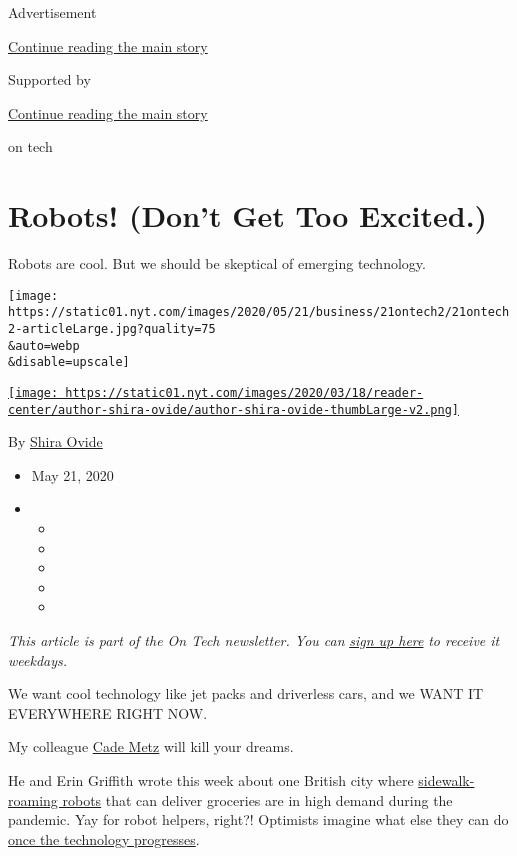 Advertisement

\protect\hyperlink{after-top}{Continue reading the main story}

Supported by

\protect\hyperlink{after-sponsor}{Continue reading the main story}

on tech

\hypertarget{robots-dont-get-too-excited}{%
\section{Robots! (Don't Get Too
Excited.)}\label{robots-dont-get-too-excited}}

Robots are cool. But we should be skeptical of emerging technology.

\texttt{[image: https://static01.nyt.com/images/2020/05/21/business/21ontech2/21ontech2-articleLarge.jpg?quality=75\\\&auto=webp\\\&disable=upscale]}

\href{https://www.nytimes.com/by/shira-ovide}{\texttt{[image: https://static01.nyt.com/images/2020/03/18/reader-center/author-shira-ovide/author-shira-ovide-thumbLarge-v2.png]}}

By \href{https://www.nytimes.com/by/shira-ovide}{Shira Ovide}

\begin{itemize}
\item
  May 21, 2020
\item
  \begin{itemize}
  \item
  \item
  \item
  \item
  \item
  \end{itemize}
\end{itemize}

\emph{This article is part of the On Tech newsletter. You can}
\href{https://www.nytimes.com/newsletters/signup/OT}{\emph{sign up
here}} \emph{to receive it weekdays.}

We want cool technology like jet packs and driverless cars, and we WANT
IT EVERYWHERE RIGHT NOW.

My colleague \href{https://www.nytimes.com/by/cade-metz}{Cade Metz} will
kill your dreams.

He and Erin Griffith wrote this week about one British city where
\href{https://www.nytimes.com/2020/05/20/technology/delivery-robots-coronavirus-milton-keynes.html}{sidewalk-roaming
robots} that can deliver groceries are in high demand during the
pandemic. Yay for robot helpers, right?! Optimists imagine what else
they can do
\href{https://arstechnica.com/tech-policy/2020/04/the-pandemic-is-bringing-us-closer-to-our-robot-takeout-future/}{once
the technology progresses}.

